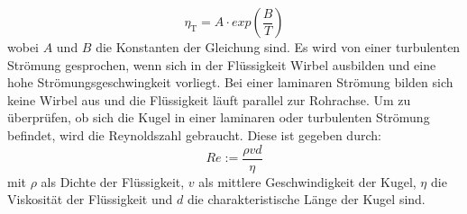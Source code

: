 \begin{equation*}
\eta_{\text{T}}=A\cdot exp(\frac{B}{T})
\end{equation*}
wobei $A$ und $B$ die Konstanten der Gleichung sind. 
Es wird von einer turbulenten Strömung gesprochen, wenn sich in der Flüssigkeit Wirbel ausbilden und eine hohe Strömungsgeschwingkeit vorliegt. Bei einer laminaren Strömung bilden sich keine Wirbel aus und die Flüssigkeit läuft parallel zur Rohrachse. Um zu überprüfen, ob sich die Kugel in einer laminaren oder turbulenten Strömung befindet, wird die Reynoldszahl gebraucht. Diese ist gegeben durch:
\begin{equation}
\label{eqn:Reynolds}
Re := \frac{\rho v d}{\eta}
\end{equation}
mit $\rho$ als Dichte der Flüssigkeit, $v$ als mittlere Geschwindigkeit der Kugel, $\eta$ die Viskosität der Flüssigkeit und $d$ die charakteristische Länge der Kugel sind. 
